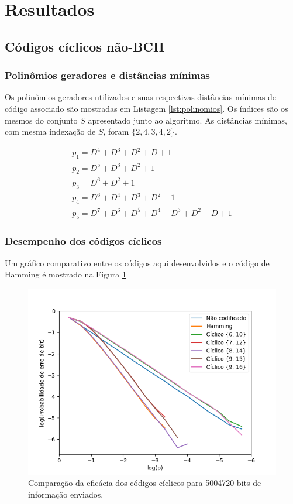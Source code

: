\section{Resultados}

\subsection{Códigos cíclicos não-BCH}

\subsubsection{Polinômios geradores e distâncias mínimas}
Os polinômios geradores utilizados e suas respectivas distâncias mínimas de código associado são mostradas em Listagem \ref{lst:polinomios}. Os índices são os mesmos do conjunto $S$ apresentado junto ao algoritmo. As distâncias mínimas, com mesma indexação de $S$, foram $\{2, 4, 3, 4, 2\}$.

\begin{align}
	\nonumber
	p_1 = D^4+D^3+D^2+D+1\\ \nonumber
	p_2 = D^5+D^3+D^2+1\\ \nonumber
	p_3 = D^6+D^2+1\\ \nonumber
	p_4 = D^6+D^4+D^3+D^2+1\\
	p_5 = D^7+D^6+D^5+D^4+D^3+D^2+D+1
	\label{lst:polinomios}
\end{align}

\subsubsection{Desempenho dos códigos cíclicos}

Um gráfico comparativo entre os códigos aqui desenvolvidos e o código de Hamming é mostrado na Figura \ref{fig:cyclic_comparison}

\begin{figure}[!hb]
	\centering
	\captionsetup{justification=centering}
	\includegraphics[scale=0.6]{floats/cyclic_5x10e6.png}
	\caption{\label{fig:cyclic_comparison}Comparação da eficácia dos códigos cíclicos para 5004720 bits de informação enviados.}
\end{figure}

